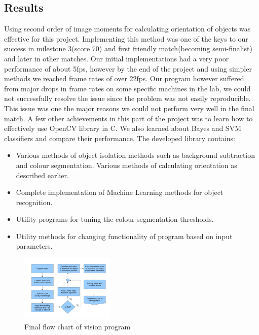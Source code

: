 \subsection{Results}
Using second order of image moments for calculating orientation of objects was effective for this project. Implementing this method was one of the keys to our success in milestone 3(score 70) and first friendly match(becoming semi-finalist) and later in other
matches. Our initial implementations had a very poor performance of about 5fps, however by the end of the project and using simpler methods we reached frame rates of over 22fps. Our program however suffered from major drops in frame rates on some specific machines in the lab, we could not successfully resolve the issue since the problem was not easily reproducible. This issue was one the major reasons we could not perform very well in the final match. 
A few other achievements in this part of the project was to learn how to effectively use OpenCV library in C. We also learned about Bayes and SVM classifiers and compare their performance.
The developed library contains:
\begin{itemize}
\item Various methods of object isolation methods such as background subtraction and colour segmentation. Various methods of calculating orientation as described earlier.
\item Complete implementation of Machine Learning methods for object recognition.
\item Utility programs for tuning the colour segmentation thresholds.
\item Utility methods for changing functionality of program based on input parameters.
\end{itemize}
\begin{figure}[htp]
\begin{center}
\leavevmode
\includegraphics[width=0.4\textwidth] {vision_stack.jpg}
\end{center}
\caption{Final flow chart of vision program}
\label{fig:CircleMethod}
\end{figure}